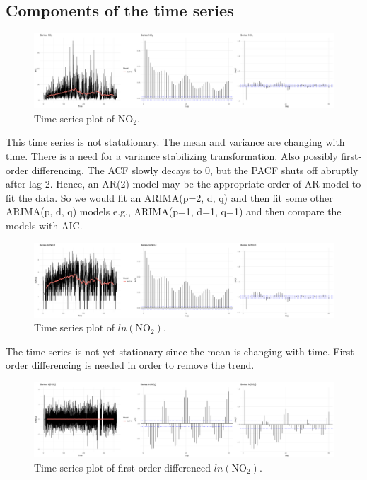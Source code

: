 \documentclass[a4paper, 10pt]{article}
\begin{document}
\begin{flushleft}
      \subsection*{Components of the time series}

      \begin{figure}[H]
         \raggedright
         \includegraphics[width=\linewidth]{../images/no2_ts_2019.png}
         \caption{Time series plot of $\text{NO}_{2}$.}
      \end{figure}

      This time series is not statationary. The mean and variance are changing with time. There is a need for a variance stabilizing transformation. Also possibly first-order differencing. The ACF slowly decays to 0, but the PACF shuts off abruptly after lag 2. Hence, an AR(2) model may be the appropriate order of AR model to fit the data. So we would fit an ARIMA(p=2, d, q) and then fit some other ARIMA(p, d, q) models e.g., ARIMA(p=1, d=1, q=1) and then compare the models with AIC.

      \begin{figure}[H]
         \raggedright
         \includegraphics[width=\linewidth]{../images/log_no2_ts_2019.png}
         \caption{Time series plot of $ln(\text{NO}_{2})$.}
      \end{figure}

      The time series is not yet stationary since the mean is changing with time. First-order differencing is needed in order to remove the trend.

      \begin{figure}[H]
         \raggedright
         \includegraphics[width=\linewidth]{../images/diff_log_no2_ts_2019.png}
         \caption{Time series plot of first-order differenced $ln(\text{NO}_{2})$.}
      \end{figure}


\end{flushleft}
\end{document}
